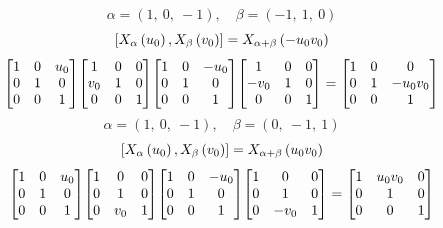 \documentclass[11pt]{article}
\theoremstyle{definition}
\begin{document}
\[
\alpha = \left( 1, \  0, \  -1\right), \quad \beta = \left( -1, \  1, \  0\right)
\]
\[
\scaletoalign{\textwidth}{\left[ X_{\alpha}\left(u_{0}\right), X_{\beta}\left(v_{0}\right) \right] = X_{\alpha + \beta}\left(- u_{0} v_{0}\right)}
\]
\[
\scaletoalign{\textwidth}{{\left[\begin{matrix}1 & 0 & u_{0}\\0 & 1 & 0\\0 & 0 & 1\end{matrix}\right]} {\left[\begin{matrix}1 & 0 & 0\\v_{0} & 1 & 0\\0 & 0 & 1\end{matrix}\right]} {\left[\begin{matrix}1 & 0 & - u_{0}\\0 & 1 & 0\\0 & 0 & 1\end{matrix}\right]} {\left[\begin{matrix}1 & 0 & 0\\- v_{0} & 1 & 0\\0 & 0 & 1\end{matrix}\right]} = {\left[\begin{matrix}1 & 0 & 0\\0 & 1 & - u_{0} v_{0}\\0 & 0 & 1\end{matrix}\right]}}
\]
\[
\alpha = \left( 1, \  0, \  -1\right), \quad \beta = \left( 0, \  -1, \  1\right)
\]
\[
\scaletoalign{\textwidth}{\left[ X_{\alpha}\left(u_{0}\right), X_{\beta}\left(v_{0}\right) \right] = X_{\alpha + \beta}\left(u_{0} v_{0}\right)}
\]
\[
\scaletoalign{\textwidth}{{\left[\begin{matrix}1 & 0 & u_{0}\\0 & 1 & 0\\0 & 0 & 1\end{matrix}\right]} {\left[\begin{matrix}1 & 0 & 0\\0 & 1 & 0\\0 & v_{0} & 1\end{matrix}\right]} {\left[\begin{matrix}1 & 0 & - u_{0}\\0 & 1 & 0\\0 & 0 & 1\end{matrix}\right]} {\left[\begin{matrix}1 & 0 & 0\\0 & 1 & 0\\0 & - v_{0} & 1\end{matrix}\right]} = {\left[\begin{matrix}1 & u_{0} v_{0} & 0\\0 & 1 & 0\\0 & 0 & 1\end{matrix}\right]}}
\]
\end{document}
